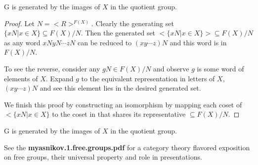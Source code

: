 \documentclass[10pt]{article}
\begin{document}
\begin{proposition}
	G is generated by the images of $X$ in the quotient group.
\end{proposition}
\begin{proof}
Let $N = <R>^{F(X)}$. Clearly the generating set $\{ xN | x \in X \} \subseteq F(X) / N$. Then the
generated set $< \{ xN | x \in X \} > \subseteq F(X) / N$ as any word
$xNyN \cdots zN$ can be reduced to $(xy \cdots z)N$ and this word is in
$F(X) / N$.

To see the reverse, consider any $gN \in F(X) / N$ and observe $g$ is some word of
elements of $X$. Expand $g$ to the equivalent representation in letters of
$X$, $(xy \cdots z)N$ and see this element lies in the desired generated set.

We finish this proof by constructing an isomorphism by mapping each coset of $<
\{ xN | x \in X \}$ to the coset in that shares its representative $\subseteq
F(X) / N$.
\end{proof}

\begin{proposition}
	G is generated by the images of $X$ in the quotient group.
\end{proposition}

% 
% 

\begin{note}
	See the \textbf{myasnikov.1.free.groups.pdf} for a category theory flavored exposition on free
	groups, their universal property and role in presentations.
\end{note}
\end{document}
